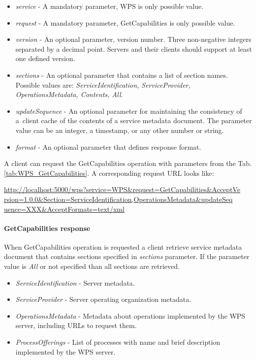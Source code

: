\begin{itemize}
\item\textit{service} - A mandatory parameter, WPS is only possible value.
\item\textit{request} - A mandatory parameter, GetCapabilities is only possible value.
\item\textit{version} - An optional parameter, version number. Three non-negative integers separated by a decimal point. Servers and
their clients should support at least one defined version.
\item\textit{sections} - An optional parameter that contains a list of section names. Possible values are: \textit{ServiceIdentification,
ServiceProvider, OperationsMetadata, Contents, All}.
\item\textit{updateSequence} - An optional parameter for maintaining the consistency of a~client cache of the contents of a service
metadata document. The parameter value can be an integer, a timestamp, or any other number or string.
\item\textit{format} - An optional parameter that defines response format.
\end{itemize}

A client can request the GetCapabilities operation with parameters from the Tab. \ref{tab:WPS_GetCapabilities}. A corresponding
request URL looks like:

\noindent
\url{http://localhost:5000/wps?service=WPS&request=GetCapabilities&AcceptVe}\\
\url{rsion=1.0.0&Section=ServiceIdentification,OperationsMetadata&updateSeq}\\
\url{uence=XXX&AcceptFormats=text/xml}

\paragraph{GetCapabilities response}
\label{para:GetCapa_response}
When GetCapabilities operation is requested a client retrieve service metadata document that contains sections specified in
\textit{sections} parameter. If the parameter value is \textit{All} or not specified than all sections are retrieved.

\begin{itemize}
\item\textit{ServiceIdentification} - Server metadata.
\item\textit{ServiceProvider} - Server operating organization metadata.
\item\textit{OperationsMetadata} - Metadata about operations implemented by the WPS server, including URLs to request them.
\item\textit{ProcessOfferings} - List of processes with name and brief description implemented by the WPS server.
\end{itemize}

